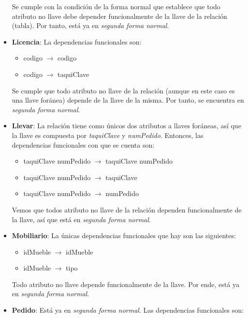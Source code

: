 \documentclass[11pt,letterpaper]{article}
\begin{document}
\begin{itemize}
Se cumple con la condición de la forma normal que establece que todo atributo no llave debe depender funcionalmente de la llave de la relación (tabla). Por tanto, está ya en \textit{segunda forma normal}. 
\item \textbf{Licencia}: La dependencias funcionales son:

\begin{itemize}
\item codigo $\rightarrow$ codigo

\item codigo $\rightarrow$ taquiClave
\end{itemize}

Se cumple que todo atributo no llave de la relación (aunque en este caso es una llave foránea) depende de la llave de la misma. Por tanto, se encuentra en \textit{segunda forma normal}. 

\item \textbf{Llevar}: La relación tiene como únicos dos atributos a llaves foráneas, así que la llave es compuesta por \textit{taquiClave} y \textit{numPedido}. Entonces, las dependencias funcionales con que se cuenta son:

\begin{itemize}
\item taquiClave numPedido $\rightarrow$ taquiClave numPedido

\item taquiClave numPedido $\rightarrow$ taquiClave
\item taquiClave numPedido $\rightarrow$ numPedido
\end{itemize}

Vemos que todos atributo no llave de la relación dependen funcionalmente de la llave, así que está en \textit{segunda forma normal}. 
\item \textbf{Mobiliario}: La únicas dependencias funcionales que hay son las siguientes:


\begin{itemize}
\item idMueble $\rightarrow$ idMueble

\item idMueble $\rightarrow$ tipo
\end{itemize}

Todo atributo no llave depende funcionalmente de la llave. Por ende, está ya en \textit{segunda forma normal}.

\item \textbf{Pedido}: Está ya en \textit{segunda forma normal}. Las dependencias funcionales son:


\end{itemize}
\end{document}
